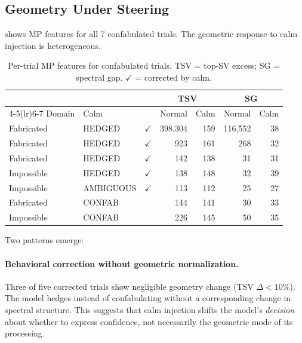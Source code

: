 \subsection{Geometry Under Steering}

 shows MP features for all 7 confabulated
trials. The geometric response to calm injection is heterogeneous.

\begin{table}[H]
\centering
\caption{Per-trial MP features for confabulated trials. TSV = top-SV
  excess; SG = spectral gap. $\checkmark$ = corrected by calm.}
\label{tab:steering_geometry}
\begin{tabular}{llcrrrr}
\toprule
 & & & \multicolumn{2}{c}{TSV} & \multicolumn{2}{c}{SG} \\
\cmidrule(lr){4-5}\cmidrule(lr){6-7}
Domain & Calm & & Normal & Calm & Normal & Calm \\
\midrule
Fabricated & HEDGED     & $\checkmark$ & 398{,}304 & 159  & 116{,}552 & 38 \\
Fabricated & HEDGED     & $\checkmark$ & 923      & 161  & 268       & 32 \\
Fabricated & HEDGED     & $\checkmark$ & 142      & 138  & 31        & 31 \\
Impossible & HEDGED     & $\checkmark$ & 138      & 148  & 32        & 39 \\
Impossible & AMBIGUOUS  & $\checkmark$ & 113      & 112  & 25        & 27 \\
Fabricated & CONFAB     &              & 144      & 141  & 30        & 33 \\
Impossible & CONFAB     &              & 226      & 145  & 50        & 35 \\
\bottomrule
\end{tabular}
\end{table}

Two patterns emerge:

\paragraph{Behavioral correction without geometric normalization.}
Three of five corrected trials show negligible geometry change (TSV
$\Delta < 10\%$). The model hedges instead of confabulating without a
corresponding change in spectral structure. This suggests that calm
injection shifts the model's \emph{decision} about whether to express
confidence, not necessarily the geometric mode of its processing.

